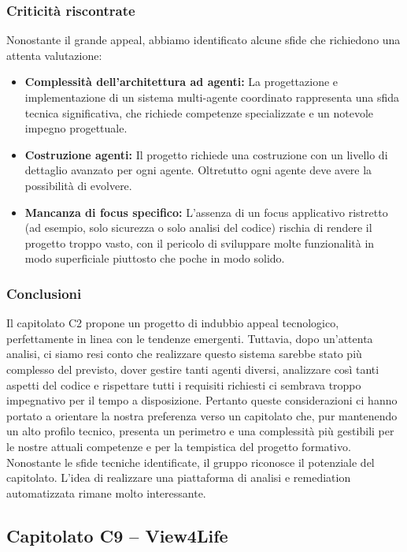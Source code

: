 \documentclass{article}
\begin{document}
	\subsubsection{Criticità riscontrate}
    Nonostante il grande appeal, abbiamo identificato alcune sfide che richiedono una attenta valutazione:
	\begin{itemize}
		\item \textbf{Complessità dell'architettura ad agenti:} La progettazione e implementazione di un sistema multi-agente coordinato rappresenta una sfida tecnica significativa, che richiede competenze specializzate e un notevole impegno progettuale.
		\item \textbf{Costruzione agenti:} Il progetto richiede una costruzione con un livello di dettaglio avanzato per ogni agente. Oltretutto ogni agente deve avere la possibilità di evolvere.
		\item \textbf{Mancanza di focus specifico:} L'assenza di un focus applicativo ristretto (ad esempio, solo sicurezza o solo analisi del codice) rischia di rendere il progetto troppo vasto, con il pericolo di sviluppare molte funzionalità in modo superficiale piuttosto che poche in modo solido.
	\end{itemize}
	
	\subsubsection{Conclusioni}
	Il capitolato C2 propone un progetto di indubbio appeal tecnologico, perfettamente in linea con le tendenze emergenti. Tuttavia, dopo un’attenta analisi, ci siamo resi conto che realizzare questo sistema sarebbe stato più complesso del previsto, dover gestire tanti agenti diversi, analizzare così tanti aspetti del codice e rispettare tutti i requisiti richiesti ci sembrava troppo impegnativo per il tempo a disposizione.
    Pertanto queste considerazioni ci hanno portato a orientare la nostra preferenza verso un capitolato che, pur mantenendo un alto profilo tecnico, presenta un perimetro e una complessità più gestibili per le nostre attuali competenze e per la tempistica del progetto formativo.
    Nonostante le sfide tecniche identificate, il gruppo riconosce il potenziale del capitolato. L'idea di realizzare una piattaforma di analisi e remediation automatizzata rimane molto interessante.

	
	\subsection{Capitolato C9 – View4Life}
\end{document}
